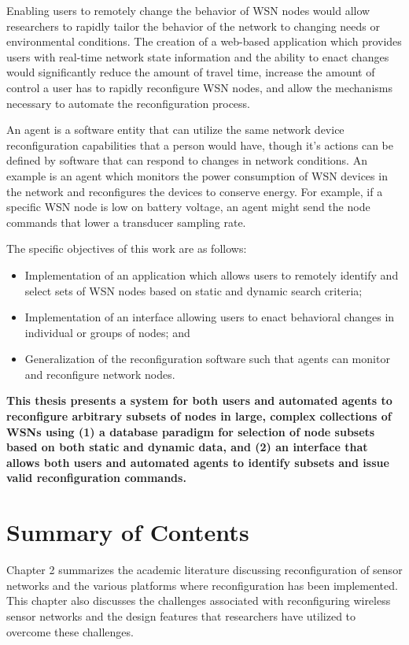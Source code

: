 Enabling users to remotely change the behavior of WSN nodes would allow researchers to rapidly tailor the behavior of the network to changing needs or environmental conditions. The creation of a web-based application which provides users with real-time network state information and the ability to enact changes would significantly reduce the amount of travel time, increase the amount of control a user has to rapidly reconfigure WSN nodes, and allow the mechanisms necessary to automate the reconfiguration process.

An agent is a software entity that can utilize the same network device reconfiguration capabilities that a person would have, though it's actions can be defined by software that can respond to changes in network conditions. An example is an agent which monitors the power consumption of WSN devices in the network and reconfigures the devices to conserve energy. For example, if a specific WSN node is low on battery voltage, an agent might send the node commands that lower a transducer sampling rate.

The specific objectives of this work are as follows:

\begin{itemize}
	\item Implementation of an application which allows users to remotely identify and select sets of WSN nodes based on static and dynamic search criteria;
	\item Implementation of an interface allowing users to enact behavioral changes in individual or groups of nodes; and
	\item Generalization of the reconfiguration software such that agents can monitor and reconfigure network nodes.
\end{itemize}


\textbf{This thesis presents a system for both users and automated agents to reconfigure arbitrary subsets of nodes in large, complex collections of WSNs using (1) a database paradigm for selection of node subsets based on both static and dynamic data, and (2) an interface that allows both users and automated agents to identify subsets and issue valid reconfiguration commands.}

\section{Summary of Contents}


Chapter 2 summarizes the academic literature discussing reconfiguration of sensor networks and the various platforms where reconfiguration has been implemented. This chapter also discusses the challenges associated with reconfiguring wireless sensor networks and the design features that researchers have utilized to overcome these challenges.

